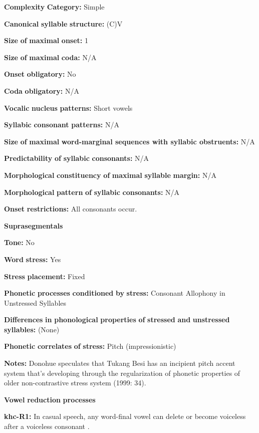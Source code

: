\textbf{Complexity} \textbf{Category:} Simple

\textbf{Canonical} \textbf{syllable} \textbf{structure:} (C)V \citep[30-1]{Donohue1999}

\textbf{Size} \textbf{of} \textbf{maximal} \textbf{onset:} 1

\textbf{Size} \textbf{of} \textbf{maximal} \textbf{coda:} N/A

\textbf{Onset} \textbf{obligatory:} No

\textbf{Coda} \textbf{obligatory:} N/A

\textbf{Vocalic} \textbf{nucleus} \textbf{patterns:} Short vowels

\textbf{Syllabic} \textbf{consonant} \textbf{patterns:} N/A

\textbf{Size} \textbf{of} \textbf{maximal} \textbf{word{}-marginal sequences with syllabic obstruents:} N/A

\textbf{Predictability} \textbf{of} \textbf{syllabic} \textbf{consonants:} N/A

\textbf{Morphological} \textbf{constituency} \textbf{of} \textbf{maximal} \textbf{syllable} \textbf{margin:} N/A

\textbf{Morphological} \textbf{pattern} \textbf{of} \textbf{syllabic} \textbf{consonants:} N/A

\textbf{Onset} \textbf{restrictions:} All consonants occur.

\textbf{Suprasegmentals}

\textbf{Tone:} No

\textbf{Word} \textbf{stress:} Yes

\textbf{Stress} \textbf{placement:} Fixed

\textbf{Phonetic} \textbf{processes} \textbf{conditioned} \textbf{by} \textbf{stress:} Consonant Allophony in Unstressed Syllables

\textbf{Differences} \textbf{in} \textbf{phonological} \textbf{properties} \textbf{of} \textbf{stressed} \textbf{and} \textbf{unstressed} \textbf{syllables:} (None)

\textbf{Phonetic} \textbf{correlates} \textbf{of} \textbf{stress:} Pitch (impressionistic)

\textbf{Notes:} Donohue speculates that Tukang Besi has an incipient pitch accent system that’s developing through the regularization of phonetic properties of older non-contrastive stress system (1999: 34).

\textbf{Vowel} \textbf{reduction} \textbf{processes}

\textbf{khc-R1:} In casual speech, any word-final vowel can delete or become voiceless after a voiceless consonant \citep[23]{Donohue1999}.

